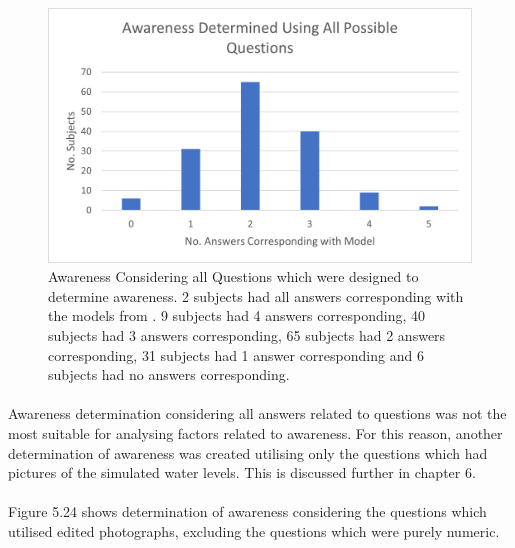 \begin{figure}[H]
    \centering
    \includegraphics{fig_results/aware_all.png}
    \caption{Awareness Considering all Questions which were designed to determine awareness.  2 subjects had all answers corresponding with the models from \cite{kartverket_se_2020}. 9 subjects had 4 answers corresponding, 40 subjects had 3 answers corresponding, 65 subjects had 2 answers corresponding, 31 subjects had 1 answer corresponding and 6 subjects had no answers corresponding. }
    \label{fig:aware-all}
\end{figure}
\paragraph{}

Awareness determination considering all answers related to questions was not the most suitable for analysing factors related to awareness. For this reason, another determination of awareness was created utilising only the questions which had pictures of the simulated water levels. This is discussed further in chapter 6. 
\paragraph{}
Figure 5.24 shows determination of awareness considering the questions which utilised edited photographs, excluding the questions which were purely numeric. 

